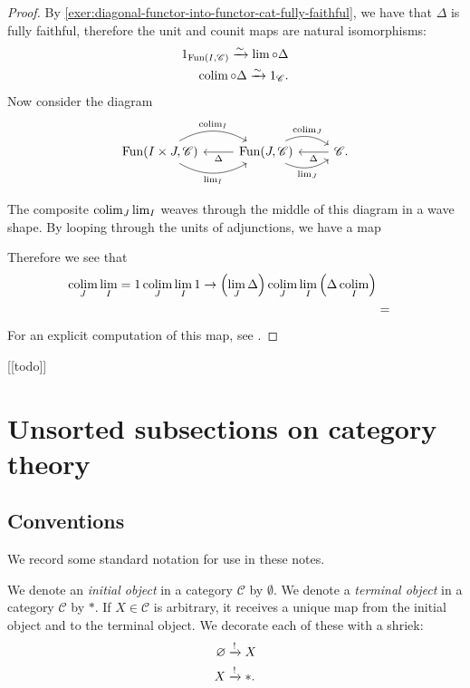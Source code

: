 \begin{proof} By \autoref{exer:diagonal-functor-into-functor-cat-fully-faithful}, we have that $\Delta$ is fully faithful, therefore the unit and counit maps are natural isomorphisms:
\begin{align*}
    1_{\text{Fun}(I,\mathscr{C})} \xrightarrow{\sim} \lim \circ \Delta \\
    \mathop{\operatorname*{colim}} \circ \Delta \xrightarrow{\sim}  1_\mathscr{C}.
\end{align*}
Now consider the diagram
\[ \begin{tikzcd}
    \Fun(I \times J, \mathscr{C})\rar[bend left=30,"\colim_I" above]\rar[bend right=30,"\lim_I" below] & \Fun(J, \mathscr{C})\lar["\Delta"]\rar[bend left=30,"\colim_J" above]\rar[bend right=30,"\lim_J" below] & \mathscr{C}\lar["\Delta"].\\
\end{tikzcd} \]

The composite $\mathop{\operatorname*{colim}}_J \lim_I$ weaves through the middle of this diagram in a wave shape. By looping through the units of adjunctions, we have a map

Therefore we see that
\begin{align*}
    \mathop{\operatorname*{colim}}_J \lim_I = 1 \mathop{\operatorname*{colim}}_J \lim_I 1 \to \left( \lim_J \Delta \right)\mathop{\operatorname*{colim}}_J \lim_I \left( \Delta \mathop{\operatorname*{colim}}_I \right) \\
    &= 
\end{align*}
For an explicit computation of this map, see \cite[3.8.3]{Riehl-context}.
\end{proof}



\begin{center}
    [[todo]]    
\end{center}




\section{Unsorted subsections on category theory}

\subsection{Conventions}

We record some standard notation for use in these notes.

\begin{notation}\label{nota:initial-terminal-objects} We denote an \textit{initial object} in a category $\mathscr{C}$ by $\emptyset$. We denote a \textit{terminal object} in a category $\mathscr{C}$ by $\ast$. If $X \in \mathscr{C}$ is arbitrary, it receives a unique map from the initial object and to the terminal object. We decorate each of these with a shriek:
\begin{align*}
    \varnothing &\xrightarrow{!} X \\
    X &\xrightarrow{!} \ast.
\end{align*}
\end{notation}

